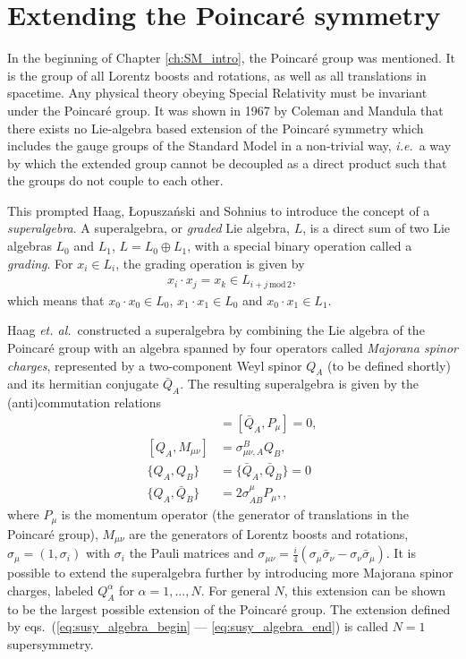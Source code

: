 \documentclass[twoside,english]{uiofysmaster}
\begin{document}

\section{Extending the Poincar\'{e} symmetry}
In the beginning of Chapter \ref{ch:SM_intro}, the Poincar\'{e} group was mentioned. It is the group of all Lorentz boosts and rotations, as well as all translations in spacetime. Any physical theory obeying Special Relativity must be invariant under the Poincar\'{e} group. It was shown in 1967 by Coleman and Mandula \cite{PhysRev.159.1251} that there exists no Lie-algebra based extension of the Poincar\'{e} symmetry which includes the gauge groups of the Standard Model in a non-trivial way, {\it i.e.}\ a way by which the extended group cannot be decoupled as a direct product such that the groups do not couple to each other. 

This prompted Haag, \L{}opusza\'{n}ski and Sohnius \cite{Haag1975257} to introduce the concept of a {\it superalgebra}. A superalgebra, or {\it graded} Lie algebra, $L$, is a direct sum of two Lie algebras $L_0$ and $L_1$, $L = L_0 \oplus L_1$, with a special binary operation called a {\it grading}. For $x_i \in L_i$, the grading operation is given by
\begin{align}
	x_i \cdot x_j = x_k \in L_{i+j\,\mathrm{mod}\,2},
\end{align}
which means that $x_0 \cdot x_0 \in L_0$, $x_1 \cdot x_1 \in L_0$ and $x_0 \cdot x_1 \in L_1$. 

Haag {\it et. al.}\ constructed a superalgebra by combining the Lie algebra of the Poincar\'{e} group with an algebra spanned by four operators called {\it Majorana spinor charges}, represented by a two-component Weyl spinor $Q_A$ (to be defined shortly) and its hermitian conjugate $\bar Q_{\dot A}$. The resulting superalgebra is given by the (anti)commutation relations
\begin{align}
	[Q_A,P_\mu] &= [\bar Q_{\dot A}, P_\mu] = 0,\label{eq:susy_algebra_begin}\\
	[Q_A, M_{\mu\nu}] &= \sigma_{\mu\nu,A}^B Q_B,\\
	\{Q_A, Q_B\} &= \{\bar Q_{\dot A}, \bar Q_{\dot B} \} = 0\\
	\{Q_A, \bar Q_{\dot B} \} &= 2\sigma^\mu_{A \dot B} P_\mu,,\label{eq:susy_algebra_end}
\end{align}
where $P_\mu$ is the momentum operator (the generator of translations in the Poincar\'{e} group), $M_{\mu\nu}$ are the generators of Lorentz boosts and rotations, $\sigma_\mu = (1,\sigma_i)$ with $\sigma_i$ the Pauli matrices and $\sigma_{\mu\nu} = \frac{i}{4}(\sigma_\mu \bar\sigma_\nu - \sigma_\nu \bar\sigma_\mu)$. It is possible to extend the superalgebra further by introducing more Majorana spinor charges, labeled $Q_A^\alpha$ for $\alpha=1,...,N$. For general $N$, this extension can be shown to be the largest possible extension of the Poincar\'{e} group. The extension defined by eqs.\ (\ref{eq:susy_algebra_begin} --- \ref{eq:susy_algebra_end}) is called $N=1$ supersymmetry.
\end{document}
